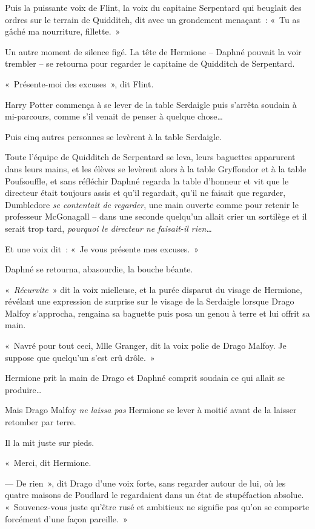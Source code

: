 Puis la puissante voix de Flint, la voix du capitaine Serpentard qui beuglait des ordres sur le terrain de Quidditch, dit avec un grondement menaçant~: «~Tu as gâché ma nourriture, fillette.~»

Un autre moment de silence figé.
La tête de Hermione -- Daphné pouvait la voir trembler -- se retourna pour regarder le capitaine de Quidditch de Serpentard.

«~Présente-moi des excuses~», dit Flint.

Harry Potter commença à se lever de la table Serdaigle puis s'arrêta soudain à mi-parcours, comme s'il venait de penser à quelque chose…

Puis cinq autres personnes se levèrent à la table Serdaigle.

Toute l'équipe de Quidditch de Serpentard se leva, leurs baguettes apparurent dans leurs mains, et les élèves se levèrent alors à la table Gryffondor et à la table Poufsouffle, et sans réfléchir Daphné regarda la table d'honneur et vit que le directeur était toujours assis et qu'il regardait, qu'il ne faisait que regarder, Dumbledore \emph{se contentait de regarder}, une main ouverte comme pour retenir le professeur McGonagall -- dans une seconde quelqu'un allait crier un sortilège et il serait trop tard, \emph{pourquoi le directeur ne faisait-il rien…}

Et une voix dit~: «~Je vous présente mes excuses.~»

Daphné se retourna, abasourdie, la bouche béante.

«~\emph{Récurvite}~» dit la voix mielleuse, et la purée disparut du visage de Hermione, révélant une expression de surprise sur le visage de la Serdaigle lorsque Drago Malfoy s'approcha, rengaina sa baguette puis posa un genou à terre et lui offrit sa main.

«~Navré pour tout ceci, Mlle Granger, dit la voix polie de Drago Malfoy.
Je suppose que quelqu'un s'est crû drôle.~»

Hermione prit la main de Drago et Daphné comprit soudain ce qui allait se produire…

Mais Drago Malfoy \emph{ne laissa pas} Hermione se lever à moitié avant de la laisser retomber par terre.

Il la mit juste sur pieds.

«~Merci, dit Hermione.

--- De rien~», dit Drago d'une voix forte, sans regarder autour de lui, où les quatre maisons de Poudlard le regardaient dans un état de stupéfaction absolue.
«~Souvenez-vous juste qu'être rusé et ambitieux ne signifie pas qu'on se comporte forcément d'une façon pareille.~»

